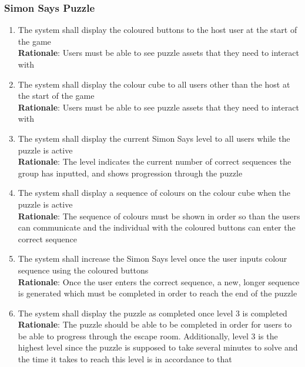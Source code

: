 \documentclass[12pt]{article}
\begin{document}
\subsubsection{Simon Says Puzzle}
    \begin{enumerate}[label=SS\arabic*., series=SimonSays]
        \item The system shall display the coloured buttons to the host user at the start of the game\\
        \textbf{Rationale}: Users must be able to see puzzle assets that they need to interact with
        \item The system shall display the colour cube to all users other than the host at the start of the game\\
        \textbf{Rationale}: Users must be able to see puzzle assets that they need to interact with
        \item The system shall display the current Simon Says level to all users while the puzzle is active\\
        \textbf{Rationale}: The level indicates the current number of correct sequences the group has inputted, and shows progression through the puzzle
        \item The system shall display a sequence of colours on the colour cube when the puzzle is active\\
        \textbf{Rationale}: The sequence of colours must be shown in order so than the users can communicate and the individual with the coloured buttons can enter the correct sequence
        \item The system shall increase the Simon Says level once the user inputs colour sequence using the coloured buttons\\
        \textbf{Rationale}: Once the user enters the correct sequence, a new, longer sequence is generated which must be completed in order to reach the end of the puzzle
        \item The system shall display the puzzle as completed once level 3 is completed\\
        \textbf{Rationale}: The puzzle should be able to be completed in order for users to be able to progress through the escape room. Additionally, level 3 is the highest level since the puzzle is supposed to take several minutes to solve and the time it takes to reach this level is in accordance to that
    \end{enumerate}
\end{document}
